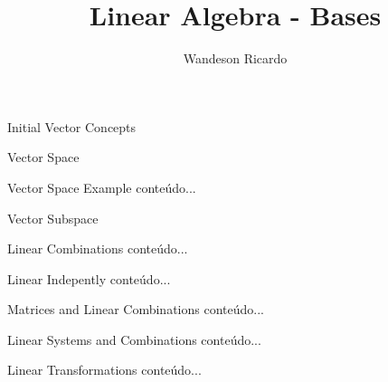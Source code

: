 \documentclass[12pt]{beamer}
\author{Wandeson Ricardo}
\title{Linear Algebra - Bases}
\begin{document}
	\maketitle
	\begin{frame}{Initial Vector Concepts}
		
	\end{frame}

	\begin{frame}{Vector Space}
		
	\end{frame}

	\begin{frame}{Vector Space Example}
		conteúdo...
	\end{frame}

	\begin{frame}{Vector Subspace}

	\end{frame}

	\begin{frame}{Linear Combinations}
		conteúdo...
	\end{frame}

	\begin{frame}{Linear Indepently}
		conteúdo...
	\end{frame}

	\begin{frame}{Matrices and Linear Combinations}
		conteúdo...
	\end{frame}

	\begin{frame}{Linear Systems and Combinations}
		conteúdo...
	\end{frame}

	\begin{frame}{Linear Transformations}
		conteúdo...
	\end{frame}

	
\end{document}
